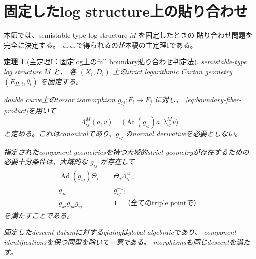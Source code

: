 \documentclass[uplatex,dvipdfmx,11pt]{jsarticle}
\numberwithin{equation}{section}
\theoremstyle{plain}
\newtheorem{theorem}{定理}[section]
\theoremstyle{definition}
\theoremstyle{remark}
\DeclareMathOperator{\At}{At}
\DeclareMathOperator{\Ad}{Ad}
\begin{document}
\section{固定したlog structure上の貼り合わせ}
\label{sec:gluing}

本節では、semistable-type log structure \(M\) を固定したときの
貼り合わせ問題を完全に決定する。
ここで得られるのが本稿の主定理Iである。


\begin{theorem}[主定理I：固定log上のfull boundary貼り合わせ判定法]
\label{thm:fixed-log-gluing}
semistable-type log structure \(M\) と、
各 \((X_i,D_i)\) 上のstrict logarithmic Cartan geometry
\((E_{H,i},\theta_i)\) を固定する。

double curve上のtorsor isomorphism \(g_{ij}:F_i\to F_j\) に対し、
\eqref{eq:boundary-fiber-product}を用いて
\begin{equation}
\label{eq:lambda-atiyah}
\Lambda^M_{ij}(a,v)
=
\bigl(\At(g_{ij})a,\lambda^M_{ij}v\bigr)
\end{equation}
と定める。これはcanonicalであり、\(g_{ij}\) のnormal derivativeを必要としない。

指定されたcomponent geometriesを持つ大域的strict geometryが存在するための
必要十分条件は、大域的な \(g_{ij}\) が存在して
\begin{align}
\Ad(g_{ij})\Theta_i&=\Theta_j\Lambda^M_{ij},
\label{eq:full-compatibility}\\
g_{ji}&=g_{ij}^{-1},
\label{eq:inverse}\\
g_{ki}g_{jk}g_{ij}&=1
\quad\text{（全てのtriple pointで）}
\label{eq:triple-cocycle}
\end{align}
を満たすことである。

固定したdescent datumに対するgluingはglobal algebraicであり、
component identificationsを保つ同型を除いて一意である。
morphismsも同じdescentを満たす。
\end{theorem}
\end{document}
